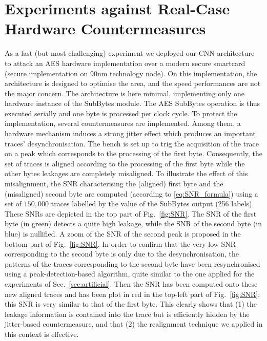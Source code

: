 \section{Experiments against Real-Case Hardware Countermeasures}\label{sec:AES}
As a last (but most challenging) experiment we deployed our CNN architecture to attack an AES hardware implementation over a modern secure smartcard (secure implementation on 90nm technology node). On this implementation, the architecture is designed to optimise the area, and the speed performances are not the major concern. The architecture is here minimal, implementing only one hardware instance of the SubBytes module.  The AES SubBytes operation is thus executed serially and one byte is processed per clock cycle. To protect the implementation, several countermeasures are implemented.  Among them, a hardware mechanism induces a strong jitter effect which produces an important traces' desynchronisation. The bench is set up to trig the acquisition of the trace on a peak which corresponds to the processing of the first byte. Consequently, the set of traces is aligned according to the processing of the first byte while the other bytes leakages are completely misaligned. To illustrate the effect of this misalignment, the SNR characterising the (aligned) first byte and the (misaligned) second byte are computed (according to \eqref{eq:SNR_formula}) using a set of $150,000$ traces labelled by the value of the SubBytes output (256 labels). These SNRs are depicted in the top part of Fig.~\ref{fig:SNR}. The SNR of the first byte (in green) detects a quite high leakage, while the SNR of the second byte (in blue) is nullified. A zoom of the SNR of the second peak is proposed in the bottom part of Fig.~\ref{fig:SNR}. In order to confirm that the very low SNR corresponding to the second byte is only due to the desynchronisation, the patterns of the traces corresponding to the second byte have been resynchronised using a peak-detection-based algorithm, quite similar to the one applied for the experiments of Sec.~\ref{sec:artificial}. Then the SNR has been computed onto these new aligned traces and has been plot in red in the top-left part of Fig.~\ref{fig:SNR}; this SNR is very similar to that of the first byte. This clearly shows that (1) the leakage information is contained into the trace but is efficiently hidden by the jitter-based countermeasure, and that (2) the realignment technique we applied in this context is effective.\\

